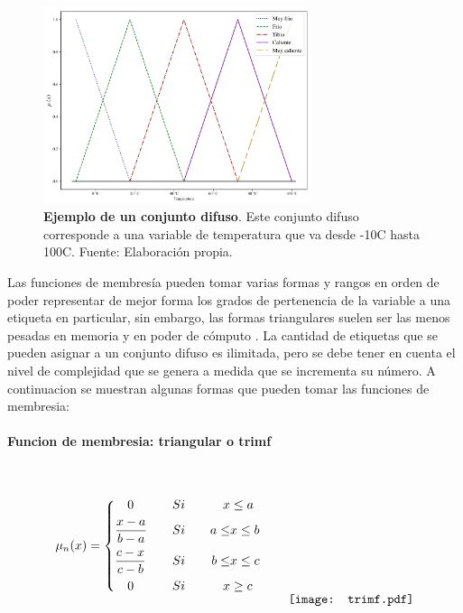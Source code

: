             \begin{figure}[htb]
                \centering
                \includegraphics[width=0.7\textwidth]{FuzzySet.pdf}
                \caption[Ejemplo de un conjunto difuso]{\textbf{Ejemplo de un conjunto difuso}. Este conjunto difuso corresponde a una variable de temperatura que va desde -10\textdegree C hasta 100\textdegree C. Fuente: Elaboración propia.} 
                \label{fig:FuzzySet}
            \end{figure}
            
            Las funciones de membresía pueden tomar varias formas y rangos en orden de poder representar de mejor forma los grados de pertenencia de la variable a una etiqueta en particular, sin embargo, las formas triangulares suelen ser las menos pesadas en memoria y en poder de cómputo \Parencite{riid2003transparent}. La cantidad de etiquetas que se pueden asignar a un conjunto difuso es ilimitada, pero se debe tener en cuenta el nivel de complejidad que se genera a medida que se incrementa su número. A continuacion se muestran algunas formas que pueden tomar las funciones de membresia:

            \paragraph{Funcion de membresia: triangular o trimf}$\quad$
            
            \begin{equation}\label{eq:trimf}
                \mu_n(x) = \left\{
                    \begin{aligned}
                        &\quad 0  &\quad &Si \quad & x &\leq a\\
                        &\frac{x - a}{b - a}  &\quad &Si \quad &  a \le &x \leq b \\
                        &\frac{c - x}{c - b}  &\quad &Si \quad & b \le &x \leq c \\
                        &\quad 0  &\quad &Si \quad&  x &\geq c
                    \end{aligned}\right.
                    \qquad
                    \raisebox{-15mm}{\texttt{[image: trimf.pdf]}}
            \end{equation}
            

